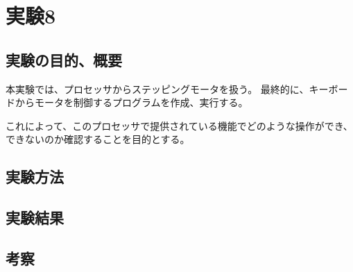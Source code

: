 \section{実験8}
\subsection{実験の目的、概要}
本実験では、プロセッサからステッピングモータを扱う。
最終的に、キーボードからモータを制御するプログラムを作成、実行する。

これによって、このプロセッサで提供されている機能でどのような操作ができ、できないのか確認することを目的とする。

\subsection{実験方法}

\subsection{実験結果}

\subsection{考察}
